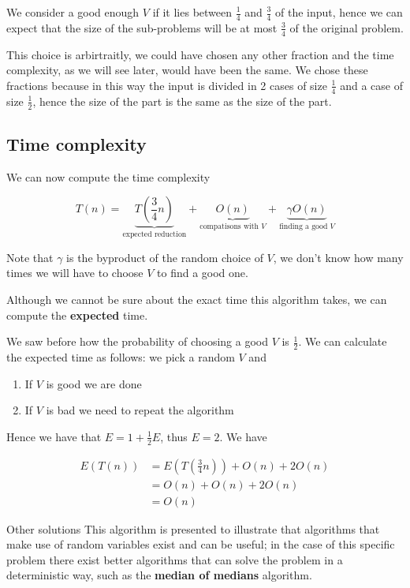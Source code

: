 \documentclass[10pt]{extarticle}
\begin{document}
We consider a good enough $V$ if it lies between $\frac{1}{4}$ and $\frac{3}{4}$ of the input,
hence we can expect that the size of the sub-problems will be at most $\frac{3}{4}$ of the original problem.

This choice is arbirtraitly, we could have chosen any other fraction and the time complexity,
as we will see later, would have been the same.
We chose these fractions because in this way the input
is divided in 2  cases of size $\frac{1}{4}$ and a  case of size $\frac{1}{2}$,
hence the size of the  part is the same as the size of the  part.

\subsection{Time complexity}

We can now compute the time complexity

$$
    T(n) = \underbrace{T\left(\frac{3}{4}n\right)}
    _{\text{expected reduction}} +
    \underbrace{O(n)}_{\text{compatisons with } V}
    + \underbrace{\gamma O(n)}_{\text{finding a good } V}
$$

Note that $\gamma$ is the byproduct of the random choice of $V$,
we don't know how many times we will have to choose $V$ to find a good one.

Although we cannot be sure about the exact time this algorithm takes,
we can compute the \textbf{expected} time.

We saw before how the probability of choosing a good $V$ is $\frac{1}{2}$.
We can calculate the expected time as follows:
we pick a random $V$ and

\begin{enumerate}
    \item If $V$ is good we are done
    \item If $V$ is bad we need to repeat the algorithm
\end{enumerate}

Hence we have that $E = 1 + \frac{1}{2} E$, thus $E = 2$.
We have


\begin{align*}
    E(T(n)) & = E\left(T\left(\frac{3}{4}n\right)\right) + O(n) + 2O(n) \\
            & = O(n) + O(n) + 2O(n)                                     \\
            & = O(n)
\end{align*}

\begin{notebox}{Other solutions}
    This algorithm is presented to illustrate that algorithms that make use of random variables exist and can be useful;
    in the case of this specific problem there exist better algorithms that can solve the problem in a deterministic way,
    such as the \textbf{median of medians} algorithm.
\end{notebox}
\end{document}
